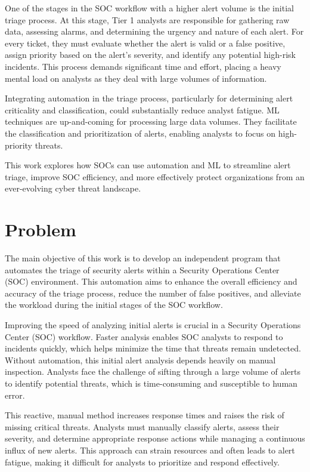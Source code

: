 One of the stages in the \gls{SOC} workflow with a higher alert volume is the initial triage process. At this stage, Tier 1 analysts are responsible for gathering raw data, assessing alarms, and determining the urgency and nature of each alert. For every ticket, they must evaluate whether the alert is valid or a false positive, assign priority based on the alert’s severity, and identify any potential high-risk incidents. \parencite{Vielberth2020} This process demands significant time and effort, placing a heavy mental load on analysts as they deal with large volumes of information.

Integrating automation in the triage process, particularly for determining alert criticality and classification, could substantially reduce analyst fatigue. \gls{ML} techniques are up-and-coming for processing large data volumes. They facilitate the classification and prioritization of alerts, enabling analysts to focus on high-priority threats. \parencite{Jalalvand2024}

This work explores how \gls{SOC}s can use automation and \gls{ML} to streamline alert triage, improve \gls{SOC} efficiency, and more effectively protect organizations from an ever-evolving cyber threat landscape.

\section{Problem}

The main objective of this work is to develop an independent program that automates the triage of security alerts within a Security Operations Center (SOC) environment. This automation aims to enhance the overall efficiency and accuracy of the triage process, reduce the number of false positives, and alleviate the workload during the initial stages of the SOC workflow.

Improving the speed of analyzing initial alerts is crucial in a Security Operations Center (SOC) workflow. Faster analysis enables SOC analysts to respond to incidents quickly, which helps minimize the time that threats remain undetected. Without automation, this initial alert analysis depends heavily on manual inspection. Analysts face the challenge of sifting through a large volume of alerts to identify potential threats, which is time-consuming and susceptible to human error. 

This reactive, manual method increases response times and raises the risk of missing critical threats. Analysts must manually classify alerts, assess their severity, and determine appropriate response actions while managing a continuous influx of new alerts. This approach can strain resources and often leads to alert fatigue, making it difficult for analysts to prioritize and respond effectively.

